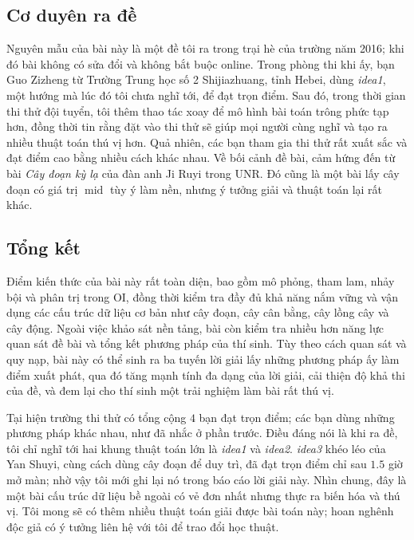 \documentclass[11pt]{article}
\begin{document}
\subsection{Cơ duyên ra đề}

Nguyên mẫu của bài này là một đề tôi ra trong trại hè của trường năm 2016; khi
đó bài không có sửa đổi và không bắt buộc online. Trong phòng thi khi ấy, bạn
Guo Zizheng từ Trường Trung học số 2 Shijiazhuang, tỉnh Hebei, dùng
\emph{idea1}, một hướng mà lúc đó tôi chưa nghĩ tới, để đạt trọn điểm. Sau đó,
trong thời gian thi thử đội tuyển, tôi thêm thao tác xoay để mô hình bài toán
trông phức tạp hơn, đồng thời tin rằng đặt vào thi thử sẽ giúp mọi người cùng
nghĩ và tạo ra nhiều thuật toán thú vị hơn. Quả nhiên, các bạn tham gia thi
thử rất xuất sắc và đạt điểm cao bằng nhiều cách khác nhau. Về bối cảnh đề
bài, cảm hứng đến từ bài \emph{Cây đoạn kỳ lạ} của đàn anh Ji Ruyi trong UNR.
Đó cũng là một bài lấy cây đoạn có giá trị \(\operatorname{mid}\) tùy ý làm
nền, nhưng ý tưởng giải và thuật toán lại rất khác.

\subsection{Tổng kết}

Điểm kiến thức của bài này rất toàn diện, bao gồm mô phỏng, tham lam, nhảy bội
và phân trị trong OI, đồng thời kiểm tra đầy đủ khả năng nắm vững và vận dụng
các cấu trúc dữ liệu cơ bản như cây đoạn, cây cân bằng, cây lồng cây và cây
động. Ngoài việc khảo sát nền tảng, bài còn kiểm tra nhiều hơn năng lực quan
sát đề bài và tổng kết phương pháp của thí sinh. Tùy theo cách quan sát và quy
nạp, bài này có thể sinh ra ba tuyến lời giải lấy những phương pháp ấy làm
điểm xuất phát, qua đó tăng mạnh tính đa dạng của lời giải, cải thiện độ khả
thi của đề, và đem lại cho thí sinh một trải nghiệm làm bài rất thú vị.

Tại hiện trường thi thử có tổng cộng \(4\) bạn đạt trọn điểm; các bạn dùng
những phương pháp khác nhau, như đã nhắc ở phần trước. Điều đáng nói là khi ra
đề, tôi chỉ nghĩ tới hai khung thuật toán lớn là \emph{idea1} và \emph{idea2}.
\emph{idea3} khéo léo của Yan Shuyi, cùng cách dùng cây đoạn để duy trì, đã
đạt trọn điểm chỉ sau \(1.5\) giờ mở màn; nhờ vậy tôi mới ghi lại nó trong báo
cáo lời giải này. Nhìn chung, đây là một bài cấu trúc dữ liệu bề ngoài có vẻ
đơn nhất nhưng thực ra biến hóa và thú vị. Tôi mong sẽ có thêm nhiều thuật toán
giải được bài toán này; hoan nghênh độc giả có ý tưởng liên hệ với tôi để trao
đổi học thuật.
\end{document}

